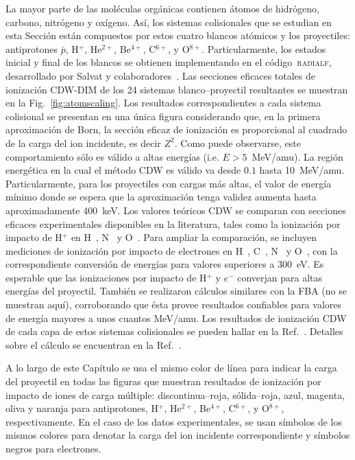 La mayor parte de las moléculas orgánicas contienen átomos de hidrógeno, 
carbono, nitrógeno y oxígeno. Así, los sistemas colisionales que se 
estudian en esta Sección están compuestos por estos cuatro blancos 
atómicos y los proyectiles: antiprotones $\bar{p}$, H$^{+}$, He$^{2+}$, 
Be$^{4+}$, C$^{6+}$, y O$^{8+}$. Particularmente, los estados inicial y 
final de los blancos se obtienen implementando en el 
código~\textsc{radialf}, desarrollado por Salvat y 
colaboradores~\cite{salvat1995}. Las secciones eficaces totales de 
ionización CDW-DIM de los 24 sistemas blanco--proyectil resultantes se 
muestran en la Fig.~\ref{fig:atomscaling}. Los resultados 
correspondientes a cada sistema colisional se presentan en una única 
figura considerando que, en la primera aproximación de Born, la sección 
eficaz de ionización es proporcional al cuadrado de la carga del ion 
incidente, es decir $Z^{2}$. Como puede observarse, este comportamiento 
sólo es válido a altas energías (i.e. $E>5$~MeV/amu). La región 
energética en la cual el método CDW es válido va desde $0.1$ hasta 
10~MeV/amu. Particularmente, para los proyectiles con cargas más altas, 
el valor de energía mínimo donde se espera que la aproximación tenga 
validez aumenta hasta aproximadamente 400~keV. Los valores teóricos CDW 
se comparan con secciones eficaces experimentales disponibles en la 
literatura, tales como la ionización por impacto de H$^+$ en 
H~\cite{Shah:81}, N~\cite{Rudd:85} y O~\cite{Rudd:85}. Para ampliar la 
comparación, se incluyen mediciones de ionización por impacto de 
electrones en H~\cite{Shah:87}, C~\cite{Brook:78}, N~\cite{Brook:78} 
y O~\cite{Thompson:95}, con la correspondiente conversión de energías
para valores superiores a 300~eV. Es esperable que las ionizaciones por 
impacto de H$^+$ y $e^-$ converjan para altas energías del proyectil. 
También se realizaron cálculos similares con la FBA (no se muestran 
aquí), corroborando que ésta provee resultados confiables para valores 
de energía mayores a unos cuantos MeV/amu. Los resultados de ionización 
CDW de cada capa de estos sistemas colisionales se pueden hallar en la 
Ref.~\cite{Miraglia:19}. Detalles sobre el cálculo se encuentran en la
Ref.~\cite{Montanari:17-iongasesnobles}.

A lo largo de este Capítulo se usa el mismo color de línea para indicar 
la carga del proyectil en todas las figuras que muestran resultados de 
ionización por impacto de iones de carga múltiple: discontinua--roja, 
sólida--roja, azul, magenta, oliva y naranja para antiprotones, H$^{+}$, 
He$^{2+}$, Be$^{4+}$, C$^{6+}$, y O$^{8+}$, respectivamente. En el caso 
de los datos experimentales, se usan símbolos de los mismos colores para 
denotar la carga del ion incidente correspondiente y símbolos negros 
para electrones. 

